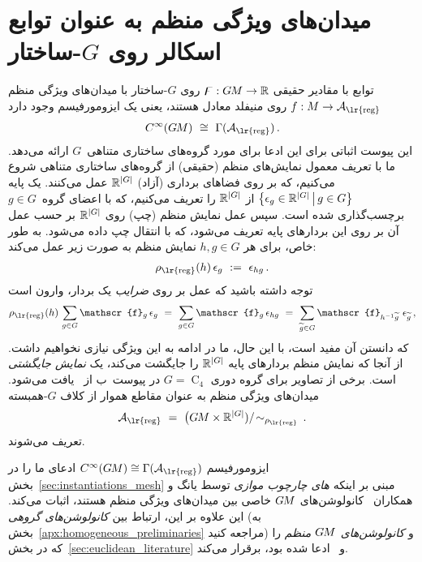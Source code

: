 

\section{میدان‌های ویژگی منظم به عنوان توابع اسکالر روی $G$-ساختار}
\label{apx:regular_field_scalar_GM}


توابع با مقادیر حقیقی $\digamma: G\mkern-1.4muM \to \mathbb{R}$ روی $G$-ساختار با میدان‌های ویژگی منظم $f: M \to \A_{\textup{\lr{reg}}}$ روی منیفلد معادل هستند، یعنی یک ایزومورفیسم وجود دارد
\begin{align}
    C^\infty(\GM)\ \cong\ \Gamma(\A_{\textup{\lr{reg}}}) \,.
\end{align}
این پیوست اثباتی برای این ادعا برای مورد گروه‌های ساختاری متناهی~$G$ ارائه می‌دهد.
ما با تعریف معمول نمایش‌های منظم (حقیقی) از گروه‌های ساختاری متناهی شروع می‌کنیم، که بر روی فضاهای برداری (آزاد) $\mathbb{R}^{|G|}$ عمل می‌کنند.
یک پایه $\big\{ \epsilon_g \in \mathbb{R}^{|G|} \,\big|\, g\in G \big\}$ از $\mathbb{R}^{|G|}$ را تعریف می‌کنیم، که با اعضای گروه~$g\in G$ برچسب‌گذاری شده است.
سپس عمل نمایش منظم (چپ) روی $\mathbb{R}^{|G|}$ بر حسب عمل آن بر روی این بردارهای پایه تعریف می‌شود، که با انتقال چپ داده می‌شود.
به طور خاص، برای هر $h,g\in G$ نمایش منظم به صورت زیر عمل می‌کند:
\begin{align}\label{eq:finite_regular_rep_action}
    \rho_{\textup{\lr{reg}}}(h)\, \epsilon_g\ :=\ \epsilon_{hg} \,.
\end{align}
توجه داشته باشید که عمل بر روی \emph{ضرایب} یک بردار، وارون است
\begin{align}\label{eq:finite_regular_rep_action_coeffs}
    \rho_{\textup{\lr{reg}}}(h)\, \sum_{g\in G} \mathscr{f}_g\, \epsilon_g
    \ =\ \sum_{g\in G} \mathscr{f}_g\, \epsilon_{hg}
    \ =\ \sum_{{\widetilde{g}}\in G} \mathscr{f}_{h^{-1}\widetilde{g}}\ \epsilon_{\widetilde{g}} \,,
\end{align}
که دانستن آن مفید است، با این حال، ما در ادامه به این ویژگی نیازی نخواهیم داشت.
از آنجا که نمایش منظم بردارهای پایه $\mathbb{R}^{|G|}$ را جایگشت می‌کند، یک \emph{نمایش جایگشتی} است.
برخی از تصاویر برای گروه دوری $G=\operatorname{C}_4$ در پیوست~ب از~\cite{Weiler2019_E2CNN} یافت می‌شود.
میدان‌های ویژگی منظم به عنوان مقاطع هموار از کلاف $G$-همبسته
\begin{align}
    \A_{\textup{\lr{reg}}}\ =\ \big(\GM \times \R^{|G|}) /\! \sim_{\rho_\textup{\lr{reg}}} \,.
\end{align}
تعریف می‌شوند.


ایزومورفیسم $C^\infty(\GM) \cong \Gamma(\A_{\textup{\lr{reg}}})$ ادعای ما را در بخش~\ref{sec:instantiations_mesh} مبنی بر اینکه \emph{های چارچوب موازی} توسط یانگ و همکاران~\cite{Yang2020parallelFrameCNN} کانولوشن‌های $G\mkern-1.4muM$ خاصی بین میدان‌های ویژگی منظم هستند، اثبات می‌کند.
این علاوه بر این، ارتباط بین \emph{کانولوشن‌های گروهی} (به بخش~\ref{apx:homogeneous_preliminaries} مراجعه کنید) و \emph{کانولوشن‌های $G\mkern-1.4muM$ منظم} را که در بخش~\ref{sec:euclidean_literature} و~\cite{Weiler2019_E2CNN} ادعا شده بود، برقرار می‌کند.


